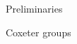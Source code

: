\documentclass[11pt]{amsart}
\theoremstyle{definition}
\newtheorem{remark}[theorem]{Remark}
\numberwithin{equation}{section}
\newcommand{\C}{\widetilde{C}}
\renewcommand{\(}{\left(}
\renewcommand{\)}{\right)}
\newcommand{\w}{\mathsf{w}}
\DeclareMathOperator{\FC}{FC}
\begin{document}
\begin{section}{Preliminaries}
\begin{subsection}{Coxeter groups}

\end{subsection}


%



\end{section}
\end{document}
